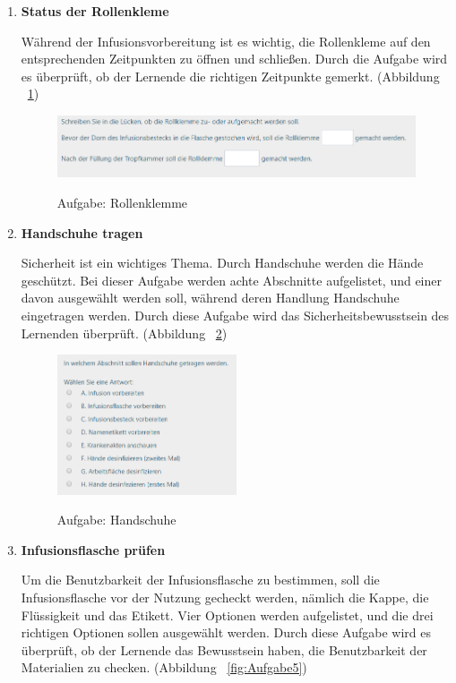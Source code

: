 \begin{enumerate}
    \item \textbf{Status der Rollenkleme}
    
    Während der Infusionsvorbereitung ist es wichtig, die Rollenkleme auf den entsprechenden Zeitpunkten zu öffnen und schließen. Durch die Aufgabe wird es überprüft, ob der Lernende die richtigen Zeitpunkte gemerkt. (Abbildung ~\ref{fig:Aufgabe3})
    
\begin{figure}[ht]
\vspace*{1em}
\centering
\caption{Aufgabe: Rollenklemme}
\includegraphics[width= \textwidth]{images/Aufgabe3.png}
\label{fig:Aufgabe3} 
\end{figure}
    
    \item \textbf{Handschuhe tragen}
    
    Sicherheit ist ein wichtiges Thema. Durch Handschuhe werden die Hände geschützt. Bei dieser Aufgabe werden achte Abschnitte aufgelistet, und einer davon ausgewählt werden soll, während deren Handlung Handschuhe eingetragen werden. Durch diese Aufgabe wird das Sicherheitsbewusstsein des Lernenden überprüft. (Abbildung ~\ref{fig:Aufgabe4})
    
\begin{figure}[ht]
\vspace*{1em}
\centering
\caption{Aufgabe: Handschuhe}
\includegraphics[width= 0.5\textwidth]{images/Aufgabe4.png}
\label{fig:Aufgabe4} 
\end{figure}
    
    \item \textbf{Infusionsflasche prüfen}
    
    Um die Benutzbarkeit der Infusionsflasche zu bestimmen, soll die Infusionsflasche vor der Nutzung gecheckt werden, nämlich die Kappe, die Flüssigkeit und das Etikett. Vier Optionen werden aufgelistet, und die drei richtigen Optionen sollen ausgewählt werden. Durch diese Aufgabe wird es überprüft, ob der Lernende das Bewusstsein haben, die Benutzbarkeit der Materialien zu checken. (Abbildung ~\ref{fig:Aufgabe5})
    

\end{enumerate}
